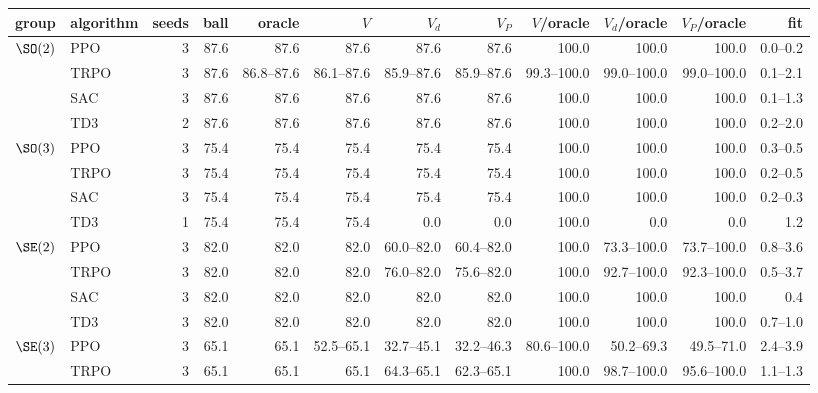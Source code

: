 \begin{tabular}{@{}llrrrrrrrrrr@{}}
\toprule
group & algorithm & seeds & ball & oracle & $V$ & $V_d$ & $V_P$ & $V$/oracle & $V_d$/oracle & $V_P$/oracle & fit \\
\midrule
$\SO(2)$ & PPO & 3 & 87.6 & 87.6 & 87.6 & 87.6 & 87.6 & 100.0 & 100.0 & 100.0 & 0.0--0.2 \\
 & TRPO & 3 & 87.6 & 86.8--87.6 & 86.1--87.6 & 85.9--87.6 & 85.9--87.6 & 99.3--100.0 & 99.0--100.0 & 99.0--100.0 & 0.1--2.1 \\
 & SAC & 3 & 87.6 & 87.6 & 87.6 & 87.6 & 87.6 & 100.0 & 100.0 & 100.0 & 0.1--1.3 \\
 & TD3 & 2 & 87.6 & 87.6 & 87.6 & 87.6 & 87.6 & 100.0 & 100.0 & 100.0 & 0.2--2.0 \\
\midrule
$\SO(3)$ & PPO & 3 & 75.4 & 75.4 & 75.4 & 75.4 & 75.4 & 100.0 & 100.0 & 100.0 & 0.3--0.5 \\
 & TRPO & 3 & 75.4 & 75.4 & 75.4 & 75.4 & 75.4 & 100.0 & 100.0 & 100.0 & 0.2--0.5 \\
 & SAC & 3 & 75.4 & 75.4 & 75.4 & 75.4 & 75.4 & 100.0 & 100.0 & 100.0 & 0.2--0.3 \\
 & TD3 & 1 & 75.4 & 75.4 & 75.4 & 0.0 & 0.0 & 100.0 & 0.0 & 0.0 & 1.2 \\
\midrule
$\SE(2)$ & PPO & 3 & 82.0 & 82.0 & 82.0 & 60.0--82.0 & 60.4--82.0 & 100.0 & 73.3--100.0 & 73.7--100.0 & 0.8--3.6 \\
 & TRPO & 3 & 82.0 & 82.0 & 82.0 & 76.0--82.0 & 75.6--82.0 & 100.0 & 92.7--100.0 & 92.3--100.0 & 0.5--3.7 \\
 & SAC & 3 & 82.0 & 82.0 & 82.0 & 82.0 & 82.0 & 100.0 & 100.0 & 100.0 & 0.4 \\
 & TD3 & 3 & 82.0 & 82.0 & 82.0 & 82.0 & 82.0 & 100.0 & 100.0 & 100.0 & 0.7--1.0 \\
\midrule
$\SE(3)$ & PPO & 3 & 65.1 & 65.1 & 52.5--65.1 & 32.7--45.1 & 32.2--46.3 & 80.6--100.0 & 50.2--69.3 & 49.5--71.0 & 2.4--3.9 \\
 & TRPO & 3 & 65.1 & 65.1 & 65.1 & 64.3--65.1 & 62.3--65.1 & 100.0 & 98.7--100.0 & 95.6--100.0 & 1.1--1.3 \\
\bottomrule
\end{tabular}
